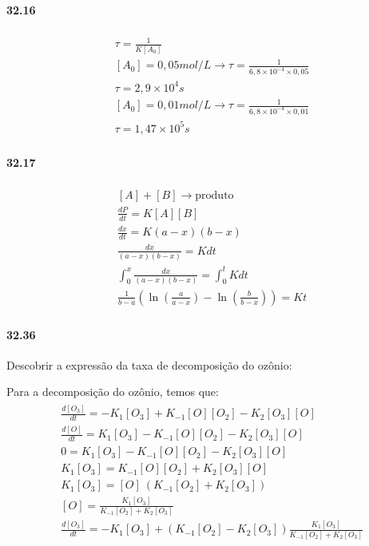 \paragraph*{32.16}

\begin{gather}
    \begin{align}
        & \tau = \frac{1}{K[A_0]} \\
        & [A_0] = 0,05 mol/L \rightarrow \tau = \frac{1}{6,8 \times 10^{-4} \times 0,05} \\
        & \tau = 2,9 \times 10^4 s \\
        & [A_0] = 0,01 mol/L \rightarrow \tau = \frac{1}{6,8 \times 10^{-4} \times 0,01} \\
        & \tau = 1,47 \times 10^5 s
    \end{align}
\end{gather}

\paragraph*{32.17}

\begin{gather}
    \begin{align}
        & [A] + [B] \rightarrow \text{produto} \\
        & \frac{dP}{dt} = K[A][B] \\
        & \frac{dx}{dt} = K(a - x)(b - x) \\
        & \frac{dx}{(a-x)(b-x)} = Kdt \\
        & \int_{0}^{x} \frac{dx}{(a-x)(b-x)} = \int_{0}^{t} Kdt \\
        & \frac{1}{b-a} \left( \ln \left( \frac{a}{a-x} \right) - \ln \left( \frac{b}{b-x} \right)   \right) = Kt
    \end{align}
\end{gather}

\paragraph*{32.36}

Descobrir a expressão da taxa de decomposição do ozônio:

Para a decomposição do ozônio, temos que:
\begin{gather}
    \begin{align}
        & \frac{d[O_3]}{dt} = -K_1 [O_3] + K_{-1} [O] [O_2] - K_2 [O_3][O] \\
        & \frac{d[O]}{dt} = K_1 [O_3] - K_{-1} [O] [O_2] - K_2 [O_3] [O] \\
        & 0 =  K_1 [O_3] - K_{-1} [O] [O_2] - K_2 [O_3] [O] \\
        & K_1 [O_3] = K_{-1} [O] [O_2] + K_2 [O_3] [O] \\
        & K_1 [O_3] = [O] \ (K_{-1} [O_2] + K_2 [O_3]) \\
        & [O] = \frac{K_1 [O_3]}{K_{-1} [O_2] + K_2 [O_3]} \\
        & \frac{d[O_3]}{dt} = -K_1 [O_3] + (K_{-1} [O_2] - K_2 [O_3]) \frac{K_1 [O_3]}{K_{-1} [O_2] + K_2 [O_3]}
    \end{align}
\end{gather}

